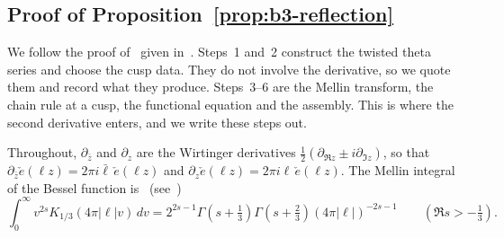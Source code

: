 \documentclass[11pt]{article}
\numberwithin{equation}{section}
\newcommand{\ce}{\check e}
\begin{document}
\subsection{Proof of Proposition~\ref{prop:b3-reflection}}\label{sec:b3-proof}

We follow the proof of~\cite[Proposition~6.2]{OAI1112} given
in~\cite[App.~A.2]{OAI1112}. Steps~1 and~2 construct the twisted theta
series and choose the cusp data. They do not involve the derivative, so
we quote them and record what they produce. Steps~3--6 are the Mellin
transform, the chain rule at a cusp, the functional equation and the
assembly. This is where the second derivative enters, and we write
these steps out.

Throughout, $\partial_{\bar z}$ and $\partial_z$ are the Wirtinger
derivatives $\frac12(\partial_{\Re z}\pm i\partial_{\Im z})$, so that
$\partial_{\bar z}\ce(\ell z)=2\pi i\bar\ell\,\ce(\ell z)$ and
$\partial_z\ce(\ell z)=2\pi i\ell\,\ce(\ell z)$. The Mellin integral of
the Bessel function is~\cite[(5.21)]{QF} (see~\cite[(10.43.19)]{DLMF})
\begin{equation}\label{eq:b3-bessel}
 \int_0^\infty v^{2s}K_{1/3}(4\pi|\ell|v)\,dv
 =2^{2s-1}\Gamma(s+\tfrac13)\Gamma(s+\tfrac23)(4\pi|\ell|)^{-2s-1}
 \qquad(\Re s>-\tfrac13).
\end{equation}
\end{document}
